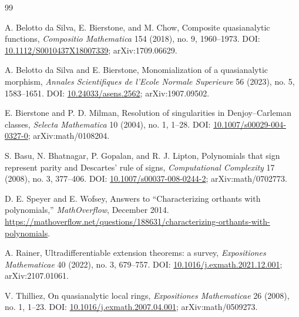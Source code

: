 \documentclass[11pt]{article}
\theoremstyle{definition}
\theoremstyle{remark}
\begin{document}
\begin{thebibliography}{99}

A. Belotto da Silva, E. Bierstone, and M. Chow,
\newblock Composite quasianalytic functions,
\newblock \emph{Compositio Mathematica} 154 (2018), no. 9, 1960--1973.
\newblock DOI: \href{https://doi.org/10.1112/S0010437X18007339}{10.1112/S0010437X18007339}; arXiv:1709.06629.

A. Belotto da Silva and E. Bierstone,
\newblock Monomialization of a quasianalytic morphism,
\newblock \emph{Annales Scientifiques de l'Ecole Normale Superieure} 56 (2023), no. 5, 1583--1651.
\newblock DOI: \href{https://doi.org/10.24033/asens.2562}{10.24033/asens.2562}; arXiv:1907.09502.

E. Bierstone and P. D. Milman,
\newblock Resolution of singularities in Denjoy--Carleman classes,
\newblock \emph{Selecta Mathematica} 10 (2004), no. 1, 1--28.
\newblock DOI: \href{https://doi.org/10.1007/s00029-004-0327-0}{10.1007/s00029-004-0327-0}; arXiv:math/0108204.


S. Basu, N. Bhatnagar, P. Gopalan, and R. J. Lipton,
\newblock Polynomials that sign represent parity and Descartes' rule of signs,
\newblock \emph{Computational Complexity} 17 (2008), no. 3, 377--406.
\newblock DOI: \href{https://doi.org/10.1007/s00037-008-0244-2}{10.1007/s00037-008-0244-2}; arXiv:math/0702773.

D. E. Speyer and E. Wofsey,
\newblock Answers to ``Characterizing orthants with polynomials,''
\newblock \emph{MathOverflow}, December 2014.
\newblock \url{https://mathoverflow.net/questions/188631/characterizing-orthants-with-polynomials}.

A. Rainer,
\newblock Ultradifferentiable extension theorems: a survey,
\newblock \emph{Expositiones Mathematicae} 40 (2022), no. 3, 679--757.
\newblock DOI: \href{https://doi.org/10.1016/j.exmath.2021.12.001}{10.1016/j.exmath.2021.12.001}; arXiv:2107.01061.

V. Thilliez,
\newblock On quasianalytic local rings,
\newblock \emph{Expositiones Mathematicae} 26 (2008), no. 1, 1--23.
\newblock DOI: \href{https://doi.org/10.1016/j.exmath.2007.04.001}{10.1016/j.exmath.2007.04.001}; arXiv:math/0509273.

\end{thebibliography}
\end{document}
